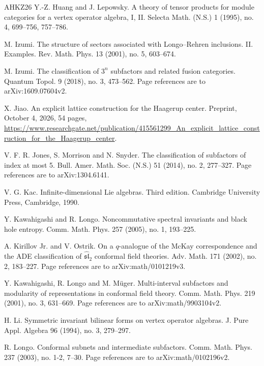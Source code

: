 \documentclass[leqno]{article}
\numberwithin{equation}{section}
\begin{document}
\begin{thebibliography}{AHKZ26}
Y.-Z. Huang and J. Lepowsky.
\newblock A theory of tensor products for module categories for a vertex operator algebra, I, II.
\newblock Selecta Math. (N.S.) 1 (1995), no. 4, 699--756, 757--786.

M. Izumi.
\newblock The structure of sectors associated with Longo--Rehren inclusions. II. Examples.
\newblock Rev. Math. Phys. 13 (2001), no. 5, 603--674.

M. Izumi.
\newblock The classification of $3^n$ subfactors and related fusion categories.
\newblock Quantum Topol. 9 (2018), no. 3, 473--562. Page references are to arXiv:1609.07604v2.

X. Jiao.
\newblock An explicit lattice construction for the Haagerup center.
\newblock Preprint, October 4, 2026, 54 pages, \url{https://www.researchgate.net/publication/415561299_An_explicit_lattice_construction_for_the_Haagerup_center}.

V. F. R. Jones, S. Morrison and N. Snyder.
\newblock The classification of subfactors of index at most 5.
\newblock Bull. Amer. Math. Soc. (N.S.) 51 (2014), no. 2, 277--327. Page references are to arXiv:1304.6141.

V. G. Kac.
\newblock Infinite-dimensional Lie algebras. Third edition.
\newblock Cambridge University Press, Cambridge, 1990.

Y. Kawahigashi and R. Longo.
\newblock Noncommutative spectral invariants and black hole entropy.
\newblock Comm. Math. Phys. 257 (2005), no. 1, 193--225.

A. Kirillov Jr. and V. Ostrik.
\newblock On a $q$-analogue of the McKay correspondence and the ADE classification of $\widehat{\mathfrak{sl}}_2$ conformal field theories.
\newblock Adv. Math. 171 (2002), no. 2, 183--227. Page references are to arXiv:math/0101219v3.

Y. Kawahigashi, R. Longo and M. Müger.
\newblock Multi-interval subfactors and modularity of representations in conformal field theory.
\newblock Comm. Math. Phys. 219 (2001), no. 3, 631--669. Page references are to arXiv:math/9903104v2.

H. Li.
\newblock Symmetric invariant bilinear forms on vertex operator algebras.
\newblock J. Pure Appl. Algebra 96 (1994), no. 3, 279--297.

R. Longo.
\newblock Conformal subnets and intermediate subfactors.
\newblock Comm. Math. Phys. 237 (2003), no. 1-2, 7--30. Page references are to arXiv:math/0102196v2.


\end{thebibliography}
\end{document}
